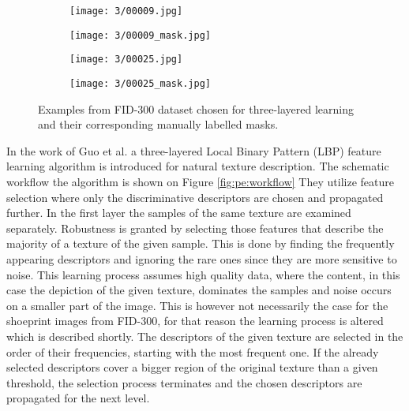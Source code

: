 \documentclass[draft,final]{vutinfth} %
\begin{document}
\begin{figure}[h]
  \centering
  \begin{subfigure}[t]{0.24\columnwidth}
    \centering
    \texttt{[image: 3/00009.jpg]}
  \end{subfigure}
  \begin{subfigure}[t]{0.24\columnwidth}
    \centering
    \texttt{[image: 3/00009\_mask.jpg]}
  \end{subfigure}
  \begin{subfigure}[t]{0.24\columnwidth}
    \centering
    \texttt{[image: 3/00025.jpg]}
  \end{subfigure}
  \begin{subfigure}[t]{0.24\columnwidth}
    \centering
    \texttt{[image: 3/00025\_mask.jpg]}
  \end{subfigure}
  \caption{Examples from FID-300 \cite{kortylewski2014unsupervised} dataset chosen for three-layered learning and their corresponding manually labelled masks.}
  \label{fig:pe:mask}
\end{figure}

\par
In the work of Guo et al. \cite{guo2012discriminative} a three-layered Local Binary Pattern (LBP) feature learning algorithm is introduced for natural texture description.
The schematic workflow the algorithm is shown on Figure \ref{fig:pe:workflow}
They utilize feature selection where only the discriminative descriptors are chosen and propagated further.
In the first layer the samples of the same texture are examined separately.
Robustness is granted by selecting those features that describe the majority of a texture of the given sample.
This is done by finding the frequently appearing descriptors and ignoring the rare ones since they are more sensitive to noise.
This learning process assumes high quality data, where the content, in this case the depiction of the given texture, dominates the samples and noise occurs on a smaller part of the image.
This is however not necessarily the case for the shoeprint images from FID-300, for that reason the learning process is altered which is described shortly.
The descriptors of the given texture are selected in the order of their frequencies, starting with the most frequent one.
If the already selected descriptors cover a bigger region of the original texture than a given threshold, the selection process terminates and the chosen descriptors are propagated for the next level.
\end{document}
